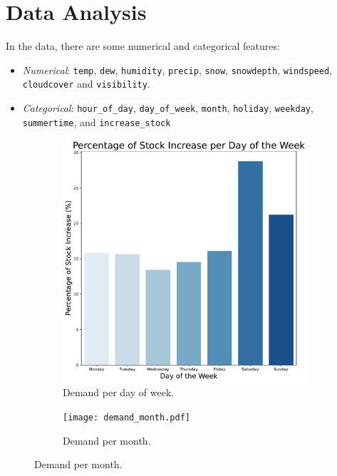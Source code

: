 \section{Data Analysis}
In the data, there are some numerical and categorical features:
\begin{itemize}
    \item \emph{Numerical}: \texttt{temp}, \texttt{dew}, \texttt{humidity}, \texttt{precip}, \texttt{snow}, \texttt{snowdepth}, \texttt{windspeed}, \texttt{cloudcover} and \texttt{visibility}.
    \item \emph{Categorical}: \texttt{hour\_of\_day}, \texttt{day\_of\_week}, \texttt{month}, \texttt{holiday}, \texttt{weekday}, \texttt{summertime}, and \texttt{increase\_stock}
\end{itemize}

\begin{figure}[htbp]
    \centering
    \begin{subfigure}{0.45\textwidth}
        \centering
        \includegraphics[width=\textwidth]{demand_day.pdf}
        \caption{Demand per day of week.}
        \label{fig:demand day}
    \end{subfigure}
    \hfill
    \begin{subfigure}{0.45\textwidth}
        \centering
        \texttt{[image: demand\_month.pdf]}
        \caption{Demand per month.}

\end{subfigure}
\end{figure}

